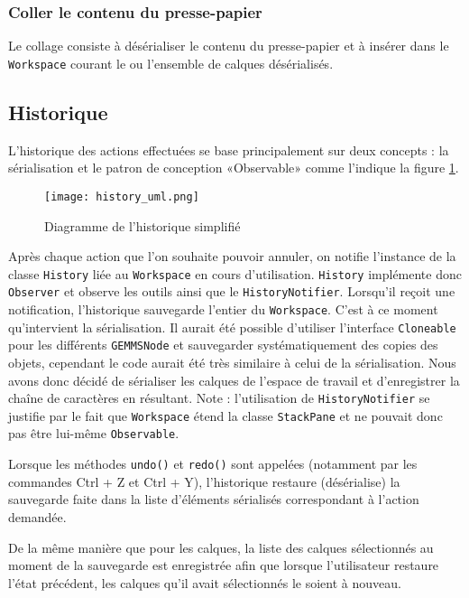 \subsubsection{Coller le contenu du presse-papier}
Le collage consiste à désérialiser le contenu du presse-papier et à insérer dans le \texttt{Workspace} courant le ou l'ensemble de calques désérialisés.

\subsection{Historique}
L'historique des actions effectuées se base principalement sur deux concepts : la sérialisation et le patron de conception «Observable» comme l'indique la figure \ref{fig:hist_uml}.

\begin{figure}[h]
    \caption{Diagramme de l'historique simplifié}
    \centering
    \texttt{[image: history\_uml.png]}
    \label{fig:hist_uml}
\end{figure}

Après chaque action que l'on souhaite pouvoir annuler, on notifie l'instance de la classe \texttt{History} liée au \texttt{Workspace} en cours d'utilisation. \texttt{History} implémente donc \texttt{Observer} et observe les outils ainsi que le \texttt{HistoryNotifier}. Lorsqu'il reçoit une notification, l'historique sauvegarde l'entier du \texttt{Workspace}. C'est à ce moment qu'intervient la sérialisation. Il aurait été possible d'utiliser l'interface \texttt{Cloneable} pour les différents \texttt{GEMMSNode} et sauvegarder systématiquement des copies des objets, cependant le code aurait été très similaire à celui de la sérialisation. Nous avons donc décidé de sérialiser les calques de l'espace de travail et d'enregistrer la chaîne de caractères en résultant. Note : l'utilisation de \texttt{HistoryNotifier} se justifie par le fait que \texttt{Workspace} étend la classe \texttt{StackPane} et ne pouvait donc pas être lui-même \texttt{Observable}.

Lorsque les méthodes \texttt{undo()} et \texttt{redo()} sont appelées (notamment par les commandes Ctrl + Z et Ctrl + Y), l'historique restaure (désérialise) la sauvegarde faite dans la liste d'éléments sérialisés correspondant à l'action demandée.

De la même manière que pour les calques, la liste des calques sélectionnés au moment de la sauvegarde est enregistrée afin que lorsque l'utilisateur restaure l'état précédent, les calques qu'il avait sélectionnés le soient à nouveau.

